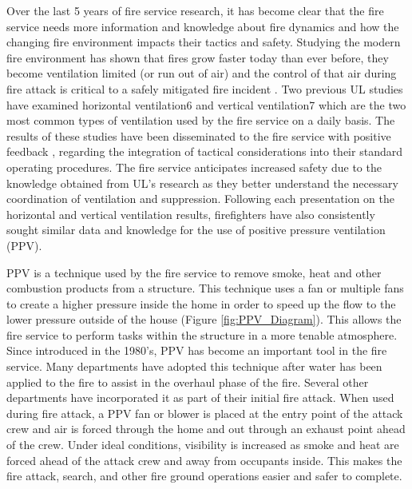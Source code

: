 \documentclass{article}
\begin{document}
Over the last 5 years of fire service research, it has become clear that the fire service needs more information and knowledge about fire dynamics and how the changing fire environment impacts their tactics and safety. Studying the modern fire environment has shown that fires grow faster today than ever before, they become ventilation limited (or run out of air) and the control of that air during fire attack is critical to a safely mitigated fire incident \cite{ChangingResdFires_Kerber}. Two previous UL studies have examined horizontal ventilation6 and vertical ventilation7 which are the two most common types of ventilation used by the fire service on a daily basis. The results of these studies have been disseminated to the fire service with positive feedback \cite{HowToKeepFirefighterSafer_Goldfeder}, \cite{SurbarbanFirefighting_Knapp} regarding the integration of tactical considerations into their standard operating procedures. The fire service anticipates increased safety due to the knowledge obtained from UL’s research as they better understand the necessary coordination of ventilation and suppression. Following each presentation on the horizontal and vertical ventilation results, firefighters have also consistently sought similar data and knowledge for the use of positive pressure ventilation (PPV). 

PPV is a technique used by the fire service to remove smoke, heat and other combustion products from a structure. This technique uses a fan or multiple fans to create a higher pressure inside the home in order to speed up the flow to the lower pressure outside of the house (Figure \ref{fig:PPV_Diagram}). This allows the fire service to perform tasks within the structure in a more tenable atmosphere. Since introduced in the 1980’s, PPV has become an important tool in the fire service. Many departments have adopted this technique after water has been applied to the fire to assist in the overhaul phase of the fire. Several other departments have incorporated it as part of their initial fire attack. When used during fire attack, a PPV fan or blower is placed at the entry point of the attack crew and air is forced through the home and out through an exhaust point ahead of the crew. Under ideal conditions, visibility is increased as smoke and heat are forced ahead of the attack crew and away from occupants inside. This makes the fire attack, search, and other fire ground operations easier and safer to complete.
\end{document}
